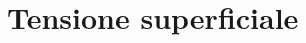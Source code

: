 \chapter{Tensione superficiale}\label{ch:tensSup}


\clearpage


\clearpage


\clearpage


\clearpage
